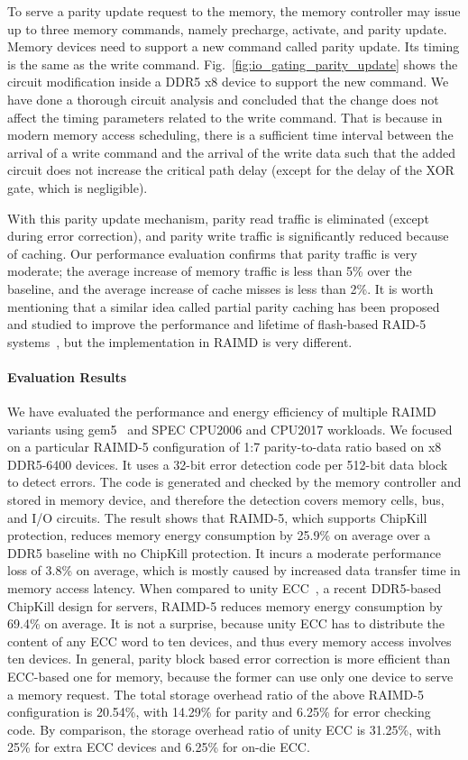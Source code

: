 \documentclass[11pt]{article}
\begin{document}
To serve a parity update request to the memory, the memory controller may issue
up to three memory commands, namely precharge, activate, and parity update.
Memory devices need to support a new command called parity update.  Its timing
is the same as the write command.
Fig.~\ref{fig:io_gating_parity_update} shows the circuit modification inside a
DDR5 x8 device to support the new command.  We have done a thorough circuit
analysis and concluded that the change does not affect the timing parameters
related to the write command.  That is because in modern memory access
scheduling, there is a sufficient time interval between the arrival of a write
command and the arrival of the write data such that the added circuit does not
increase the critical path delay (except for the delay of the XOR gate, which is
negligible).

With this parity update mechanism, parity read traffic is eliminated (except
during error correction), and parity write traffic is significantly reduced
because of caching.  Our performance evaluation confirms that parity traffic is
very moderate; the average increase of memory traffic is less than 5\% over the
baseline, and the average increase of cache misses is less than 2\%.  It is
worth mentioning that a similar idea called partial parity caching has been
proposed and studied to improve the performance and lifetime of flash-based
RAID-5 systems~\cite{flash_raid, partial_parity_cache}, but the implementation in
RAIMD is very different.

\paragraph{Evaluation Results}

We have evaluated the performance and energy efficiency of multiple RAIMD
variants using gem5~\cite{binkert2011gem5} and SPEC CPU2006 and CPU2017
workloads.  We focused on a particular RAIMD-5 configuration of 1:7
parity-to-data ratio based on x8 DDR5-6400 devices.  It uses a 32-bit error
detection code per 512-bit data block to detect errors.  The code is generated
and checked by the memory controller and stored in memory device, and therefore
the detection covers memory cells, bus, and I/O circuits.  The result shows that
RAIMD-5, which supports ChipKill protection, reduces memory energy consumption
by 25.9\% on average over a DDR5 baseline with no ChipKill protection.  It
incurs a moderate performance loss of 3.8\% on average, which is mostly caused
by increased data transfer time in memory access latency.  When compared to
unity ECC~\cite{unity_ecc}, a recent DDR5-based ChipKill design for servers,
RAIMD-5 reduces memory energy consumption by 69.4\% on average.  It is not a
surprise, because unity ECC has to distribute the content of any ECC word to ten
devices, and thus every memory access involves ten devices.  In general, parity
block based error correction is more efficient than ECC-based one for memory,
because the former can use only one device to serve a memory request.  The total
storage overhead ratio of the above RAIMD-5 configuration is 20.54\%, with
14.29\% for parity and 6.25\% for error checking code.  By comparison, the
storage overhead ratio of unity ECC is 31.25\%, with 25\% for extra ECC devices
and 6.25\% for on-die ECC.
\end{document}
